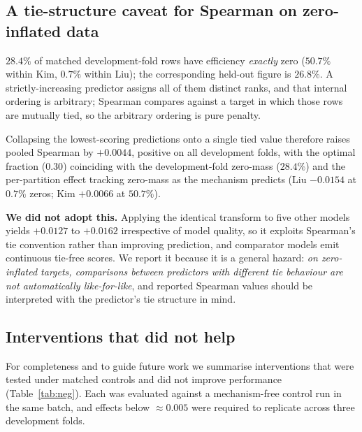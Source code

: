 \documentclass[11pt]{article}
\begin{document}
\subsection{A tie-structure caveat for Spearman on zero-inflated data}
\label{sec:ties}

$28.4\%$ of matched development-fold rows have efficiency \emph{exactly} zero
($50.7\%$ within Kim, $0.7\%$ within Liu); the corresponding held-out figure is
$26.8\%$. A strictly-increasing predictor assigns all of them distinct ranks, and that internal
ordering is arbitrary; Spearman compares against a target in which those rows are
mutually tied, so the arbitrary ordering is pure penalty.

Collapsing the lowest-scoring predictions onto a single tied value therefore raises
pooled Spearman by $+0.0044$, positive on all development folds, with the optimal
fraction ($0.30$) coinciding with the development-fold zero-mass ($28.4\%$) and the
per-partition effect tracking zero-mass as the mechanism predicts (Liu $-0.0154$ at
$0.7\%$ zeros; Kim $+0.0066$ at $50.7\%$).

\textbf{We did not adopt this.} Applying the identical transform to five other models
yields $+0.0127$ to $+0.0162$ irrespective of model quality, so it exploits Spearman's
tie convention rather than improving prediction, and comparator models emit continuous
tie-free scores. We report it because it is a general hazard: \emph{on zero-inflated
targets, comparisons between predictors with different tie behaviour are not
automatically like-for-like}, and reported Spearman values should be interpreted with
the predictor's tie structure in mind.

\subsection{Interventions that did not help}
\label{sec:domain}

For completeness and to guide future work we summarise interventions that were tested
under matched controls and did not improve performance (Table~\ref{tab:neg}). Each was
evaluated against a mechanism-free control run in the same batch, and effects below
$\approx0.005$ were required to replicate across three development folds.
\end{document}
